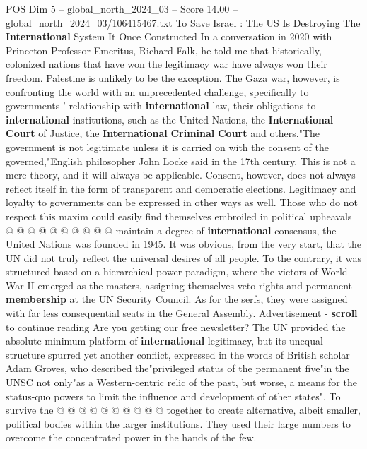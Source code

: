 \begin{textsample}{POS Dim 5 – global\_north\_2024\_03 – Score 14.00 – global\_north\_2024\_03/106415467.txt}  \label{ex:f5_pos_368}
To Save Israel : The US Is Destroying The \textbf{International} System It Once Constructed In a conversation in 2020 with Princeton Professor Emeritus, Richard Falk, he told me that historically, colonized nations that have won the legitimacy war have always won their freedom.
Palestine is unlikely to be the exception.
The Gaza war, however, is confronting the world with an unprecedented challenge, specifically to governments ' relationship with \textbf{international} law, their obligations to \textbf{international} institutions, such as the United Nations, the \textbf{International} \textbf{Court} of Justice, the \textbf{International} \textbf{Criminal} \textbf{Court} and others."The government is not legitimate unless it is carried on with the consent of the governed,"English philosopher John Locke said in the 17th century.
This is not a mere theory, and it will always be applicable.
Consent, however, does not always reflect itself in the form of transparent and democratic elections.
Legitimacy and loyalty to governments can be expressed in other ways as well.
Those who do not respect this maxim could easily find themselves embroiled in political upheavals @ @ @ @ @ @ @ @ @ @ maintain a degree of \textbf{international} consensus, the United Nations was founded in 1945.
It was obvious, from the very start, that the UN did not truly reflect the universal desires of all people.
To the contrary, it was structured based on a hierarchical power paradigm, where the victors of World War II emerged as the masters, assigning themselves veto rights and permanent \textbf{membership} at the UN Security Council.
As for the serfs, they were assigned with far less consequential seats in the General Assembly.
Advertisement - \textbf{scroll} to continue reading Are you getting our free newsletter?
The UN provided the absolute minimum platform of \textbf{international} legitimacy, but its unequal structure spurred yet another conflict, expressed in the words of British scholar Adam Groves, who described the"privileged status of the permanent five"in the UNSC not only"as a Western-centric relic of the past, but worse, a means for the status-quo powers to limit the influence and development of other states".
To survive the @ @ @ @ @ @ @ @ @ @ together to create alternative, albeit smaller, political bodies within the larger institutions.
They used their large numbers to overcome the concentrated power in the hands of the few.

\end{textsample}
